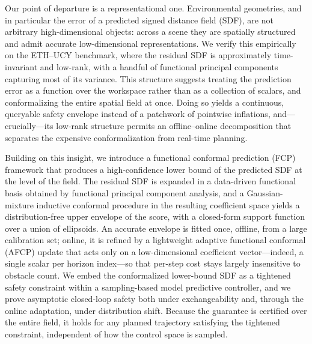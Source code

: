 \documentclass[lettersize,journal]{IEEEtran}
\begin{document}
Our point of departure is a representational one. Environmental geometries, and in particular the error of a predicted signed distance field (SDF), are not arbitrary high-dimensional objects: across a scene they are spatially structured and admit accurate low-dimensional representations. We verify this empirically on the ETH–UCY benchmark, where the residual SDF is approximately time-invariant and low-rank, with a handful of functional principal components capturing most of its variance. This structure suggests treating the prediction error as a function over the workspace rather than as a collection of scalars, and conformalizing the entire spatial field at once. Doing so yields a continuous, queryable safety envelope instead of a patchwork of pointwise inflations, and—crucially—its low-rank structure permits an offline–online decomposition that separates the expensive conformalization from real-time planning.


Building on this insight, we introduce a functional conformal prediction (FCP) framework that produces a high-confidence lower bound of the predicted SDF at the level of the field. The residual SDF is expanded in a data-driven functional basis obtained by functional principal component analysis, and a Gaussian-mixture inductive conformal procedure in the resulting coefficient space yields a distribution-free upper envelope of the score, with a closed-form support function over a union of ellipsoids. An accurate envelope is fitted once, offline, from a large calibration set; online, it is refined by a lightweight adaptive functional conformal (AFCP) update that acts only on a low-dimensional coefficient vector—indeed, a single scalar per horizon index—so that per-step cost stays largely insensitive to obstacle count. We embed the conformalized lower-bound SDF as a tightened safety constraint within a sampling-based model predictive controller, and we prove asymptotic closed-loop safety both under exchangeability and, through the online adaptation, under distribution shift. Because the guarantee is certified over the entire field, it holds for any planned trajectory satisfying the tightened constraint, independent of how the control space is sampled.
\end{document}

